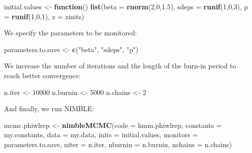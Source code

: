 \documentclass[
  12pt,
]{krantz}
\newenvironment{Shaded}{\begin{snugshade}}{\end{snugshade}}
\newcommand{\AttributeTok}[1]{\textcolor[rgb]{0.13,0.29,0.53}{#1}}
\newcommand{\ControlFlowTok}[1]{\textcolor[rgb]{0.13,0.29,0.53}{\textbf{#1}}}
\newcommand{\DecValTok}[1]{\textcolor[rgb]{0.00,0.00,0.81}{#1}}
\newcommand{\FloatTok}[1]{\textcolor[rgb]{0.00,0.00,0.81}{#1}}
\newcommand{\FunctionTok}[1]{\textcolor[rgb]{0.13,0.29,0.53}{\textbf{#1}}}
\newcommand{\NormalTok}[1]{#1}
\newcommand{\OtherTok}[1]{\textcolor[rgb]{0.56,0.35,0.01}{#1}}
\newcommand{\StringTok}[1]{\textcolor[rgb]{0.31,0.60,0.02}{#1}}
\begin{document}
\begin{Shaded}
\begin{Highlighting}[]
\NormalTok{initial.values }\OtherTok{\textless{}{-}} \ControlFlowTok{function}\NormalTok{() }\FunctionTok{list}\NormalTok{(}\AttributeTok{beta =} \FunctionTok{rnorm}\NormalTok{(}\DecValTok{2}\NormalTok{,}\DecValTok{0}\NormalTok{,}\FloatTok{1.5}\NormalTok{),}
                                  \AttributeTok{sdeps =} \FunctionTok{runif}\NormalTok{(}\DecValTok{1}\NormalTok{,}\DecValTok{0}\NormalTok{,}\DecValTok{3}\NormalTok{),}
                                  \AttributeTok{p =} \FunctionTok{runif}\NormalTok{(}\DecValTok{1}\NormalTok{,}\DecValTok{0}\NormalTok{,}\DecValTok{1}\NormalTok{),}
                                  \AttributeTok{z =}\NormalTok{ zinits)}
\end{Highlighting}
\end{Shaded}

We specify the parameters to be monitored:

\begin{Shaded}
\begin{Highlighting}[]
\NormalTok{parameters.to.save }\OtherTok{\textless{}{-}} \FunctionTok{c}\NormalTok{(}\StringTok{"beta"}\NormalTok{, }\StringTok{"sdeps"}\NormalTok{, }\StringTok{"p"}\NormalTok{)}
\end{Highlighting}
\end{Shaded}

We increase the number of iterations and the length of the burn-in period to reach better convergence:

\begin{Shaded}
\begin{Highlighting}[]
\NormalTok{n.iter }\OtherTok{\textless{}{-}} \DecValTok{10000}
\NormalTok{n.burnin }\OtherTok{\textless{}{-}} \DecValTok{5000}
\NormalTok{n.chains }\OtherTok{\textless{}{-}} \DecValTok{2}
\end{Highlighting}
\end{Shaded}

And finally, we run NIMBLE:

\begin{Shaded}
\begin{Highlighting}[]
\NormalTok{mcmc.phiwlrep }\OtherTok{\textless{}{-}} \FunctionTok{nimbleMCMC}\NormalTok{(}\AttributeTok{code =}\NormalTok{ hmm.phiwlrep, }
                            \AttributeTok{constants =}\NormalTok{ my.constants,}
                            \AttributeTok{data =}\NormalTok{ my.data,              }
                            \AttributeTok{inits =}\NormalTok{ initial.values,}
                            \AttributeTok{monitors =}\NormalTok{ parameters.to.save,}
                            \AttributeTok{niter =}\NormalTok{ n.iter,}
                            \AttributeTok{nburnin =}\NormalTok{ n.burnin, }
                            \AttributeTok{nchains =}\NormalTok{ n.chains)}
\end{Highlighting}
\end{Shaded}
\end{document}
